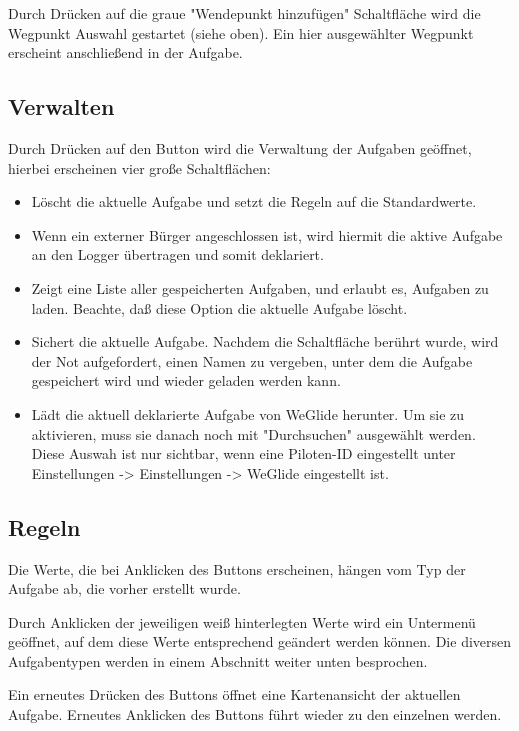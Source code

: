 Durch Drücken auf die graue "Wendepunkt hinzufügen" Schaltfläche wird die Wegpunkt Auswahl gestartet (siehe
oben).  Ein hier ausgewählter Wegpunkt erscheint anschließend in der Aufgabe.

\subsection*{Verwalten}
Durch Drücken auf den Button  wird die Verwaltung der Aufgaben geöffnet, hierbei erscheinen vier große Schaltflächen:

\begin{itemize}
\item {} Löscht die aktuelle Aufgabe und setzt die Regeln auf die Standardwerte.
\item {} Wenn ein externer Bürger angeschlossen ist, wird hiermit die aktive Aufgabe an den Logger übertragen und somit deklariert.
\item {} Zeigt eine Liste aller gespeicherten Aufgaben, und erlaubt es, Aufgaben zu laden. Beachte, daß diese Option die aktuelle Aufgabe löscht.
\item {} Sichert die aktuelle Aufgabe. Nachdem die Schaltfläche berührt wurde, wird der Not aufgefordert, einen Namen zu vergeben, unter dem die Aufgabe gespeichert wird und wieder geladen werden kann.
\item {} Lädt die aktuell deklarierte
    Aufgabe von WeGlide herunter.
    Um sie zu aktivieren, muss sie danach noch mit "Durchsuchen" ausgewählt werden.
    Diese Auswah ist nur sichtbar, wenn eine Piloten-ID eingestellt unter
    Einstellungen -> Einstellungen -> WeGlide eingestellt ist.
\end{itemize}

\subsection*{Regeln}
Die Werte, die bei Anklicken des Buttons  erscheinen, hängen vom Typ der Aufgabe ab, die vorher erstellt wurde.

Durch Anklicken der jeweiligen weiß hinterlegten Werte wird ein Untermenü geöffnet, auf dem diese Werte entsprechend geändert werden können. Die diversen Aufgabentypen werden in einem Abschnitt weiter unten besprochen.

Ein erneutes Drücken des Buttons   öffnet eine Kartenansicht der aktuellen Aufgabe. Erneutes Anklicken des Buttons führt wieder zu den einzelnen werden.

